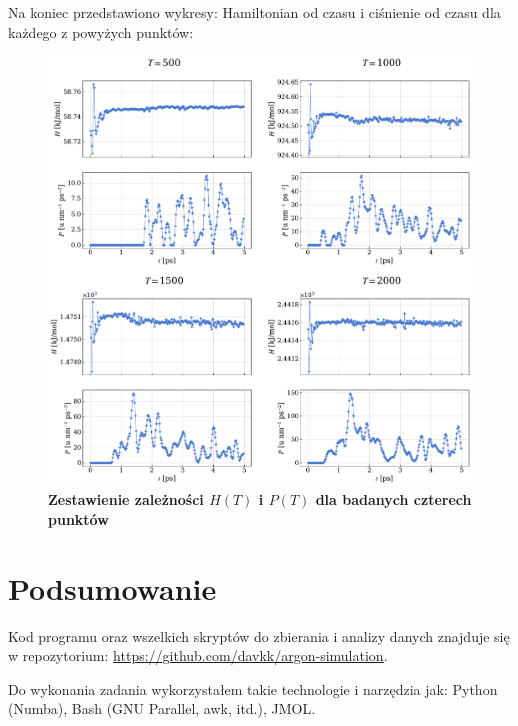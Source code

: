 \documentclass[11pt,a4paper]{article}
\begin{document}
Na koniec przedstawiono wykresy: Hamiltonian od czasu i ciśnienie od czasu dla każdego z powyżych punktów:

\begin{figure}[ht!]
    \caption{\textbf{Zestawienie zależności $H(T)$ i $P(T)$ dla badanych czterech punktów}}
    \vspace{0.2cm}
    \includegraphics[width=\linewidth]{../figures/gas_stability.pdf}
\end{figure}
\pagebreak

\section{Podsumowanie}

Kod programu oraz wszelkich skryptów do zbierania i analizy danych znajduje się w repozytorium: \url{https://github.com/davkk/argon-simulation}.

Do wykonania zadania wykorzystałem takie technologie i narzędzia jak: Python (Numba), Bash (GNU Parallel, awk, itd.), JMOL.
\end{document}
